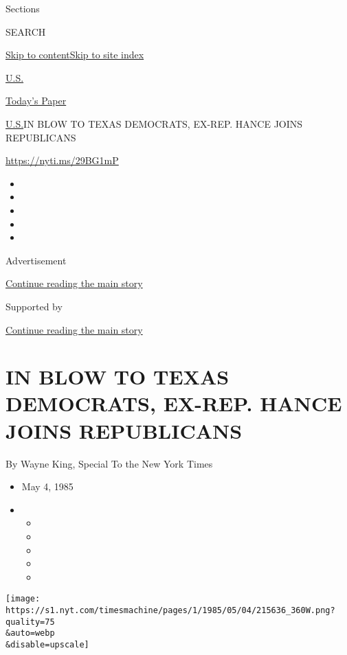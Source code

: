 Sections

SEARCH

\protect\hyperlink{site-content}{Skip to
content}\protect\hyperlink{site-index}{Skip to site index}

\href{https://www.nytimes.com/section/us}{U.S.}

\href{https://myaccount.nytimes.com/auth/login?response_type=cookie\&client_id=vi}{}

\href{https://www.nytimes.com/section/todayspaper}{Today's Paper}

\href{/section/us}{U.S.}\textbar{}IN BLOW TO TEXAS DEMOCRATS, EX-REP.
HANCE JOINS REPUBLICANS

\url{https://nyti.ms/29BG1mP}

\begin{itemize}
\item
\item
\item
\item
\item
\end{itemize}

Advertisement

\protect\hyperlink{after-top}{Continue reading the main story}

Supported by

\protect\hyperlink{after-sponsor}{Continue reading the main story}

\hypertarget{in-blow-to-texas-democrats-ex-rep-hance-joins-republicans}{%
\section{IN BLOW TO TEXAS DEMOCRATS, EX-REP. HANCE JOINS
REPUBLICANS}\label{in-blow-to-texas-democrats-ex-rep-hance-joins-republicans}}

By Wayne King, Special To the New York Times

\begin{itemize}
\item
  May 4, 1985
\item
  \begin{itemize}
  \item
  \item
  \item
  \item
  \item
  \end{itemize}
\end{itemize}

\texttt{[image: https://s1.nyt.com/timesmachine/pages/1/1985/05/04/215636\_360W.png?quality=75\\\&auto=webp\\\&disable=upscale]}

